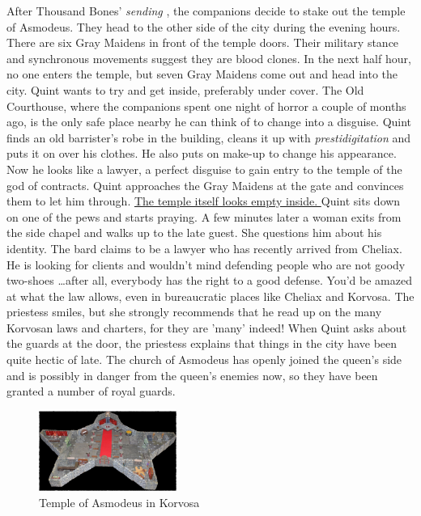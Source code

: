 After Thousand Bones' {\itshape sending} , the companions decide to stake out the temple of Asmodeus. They head to the other side of the city during the evening hours. There are six Gray Maidens in front of the temple doors. Their military stance and synchronous movements suggest they are blood clones. In the next half hour, no one enters the temple, but seven Gray Maidens come out and head into the city. Quint wants to try and get inside, preferably under cover. The Old Courthouse, where the companions spent one night of horror a couple of months ago, is the only safe place nearby he can think of to change into a disguise. Quint finds an old barrister's robe in the building, cleans it up with  {\itshape prestidigitation} and puts it on over his clothes. He also puts on make-up to change his appearance. Now he looks like a lawyer, a perfect disguise to gain entry to the temple of the god of contracts. Quint approaches the Gray Maidens at the gate and convinces them to let him through. \hyperref[fig:Temple-of-Asmodeus-in-Korvosa-614608557]{ The temple itself looks empty inside. } Quint sits down on one of the pews and starts praying. A few minutes later a woman exits from the side chapel and walks up to the late guest. She questions him about his identity. The bard claims to be a lawyer who has recently arrived from Cheliax. He is looking for clients and wouldn't mind defending people who are not goody two-shoes \ldots after all, everybody has the right to a good defense. You'd be amazed at what the law allows, even in bureaucratic places like Cheliax and Korvosa. The priestess smiles, but she strongly recommends that he read up on the many Korvosan laws and charters, for they are 'many' indeed! When Quint asks about the guards at the door, the priestess explains that things in the city have been quite hectic of late. The church of Asmodeus has openly joined the queen's side and is possibly in danger from the queen's enemies now, so they have been granted a number of royal guards. \\

\begin{figure}[h]
	\centering
	\includegraphics[width=0.4\textwidth]{images/Temple-of-Asmodeus-in-Korvosa-614608557_mod.jpg}
	\caption{Temple of Asmodeus in Korvosa}
	\label{fig:Temple-of-Asmodeus-in-Korvosa-614608557}
\end{figure}

